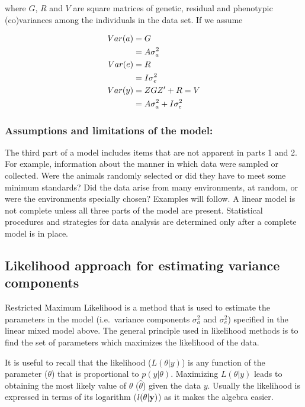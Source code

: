 \documentclass[
]{book}
\begin{document}
where \(G\), \(R\) and \(V\) are square matrices of genetic, residual and phenotypic (co)variances among the individuals in the data set. If we assume

\begin{align}
 Var(a) &= G \notag \\
        &= A\sigma_a^2 \notag \\
 Var(e) &= R \notag \\
        &= I\sigma_e^2 \notag \\
 Var(y) &= ZGZ' + R = V \notag \\
        &= A\sigma_a^2 + I\sigma_e^2 \notag
\end{align}

\hypertarget{assumptions-and-limitations-of-the-model}{%
\subsubsection*{Assumptions and limitations of the model:}\label{assumptions-and-limitations-of-the-model}}

The third part of a model includes items that are not apparent in parts 1 and 2. For
example, information about the manner in which data were sampled or collected. Were
the animals randomly selected or did they have to meet some minimum standards? Did
the data arise from many environments, at random, or were the environments specially
chosen? Examples will follow. A linear model is not complete unless all three parts of the model are present.
Statistical procedures and strategies for data analysis are determined only after a complete
model is in place.

\hypertarget{likelihood-approach-for-estimating-variance-components}{%
\subsection{Likelihood approach for estimating variance components}\label{likelihood-approach-for-estimating-variance-components}}

Restricted Maximum Likelihood is a method that is used to estimate the parameters in the model (i.e.~variance components \(\sigma_{a}^2\) and \(\sigma_{e}^2\)) specified in the linear mixed model above. The general principle used in likelihood methods is to find the set of parameters which maximizes the likelihood of the data.

It is useful to recall that the likelihood (\(L(\theta|{y})\)) is any function of the parameter (\(\theta\)) that is proportional to \(p({y}|\theta)\). Maximizing \(L(\theta|{y})\) leads to obtaining the most likely value of \(\theta\) (\(\hat{\theta}\)) given the data \({y}\). Usually the likelihood is expressed in terms of its logarithm (\(l(\theta|\bf{y})\)) as it makes the algebra easier.
\end{document}
